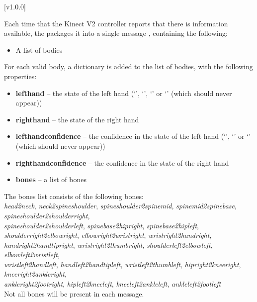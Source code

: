 [v1.0.0]

Each time that the Kinect V2 controller reports that there is information available,
the  packages it into a single message
\openSq{}\closeSq, containing the following:
\begin{itemize}
\item A list of bodies
\end{itemize}

For each valid body, a dictionary \openSq{}\closeSq{} is added to the list
of bodies, with the following properties:
\begin{itemize}
\item \textbf{lefthand} -- the state of the left hand (`', `',
`' or `' (which should never appear))
\item \textbf{righthand} -- the state of the right hand
\item \textbf{lefthandconfidence} -- the confidence in the state of the left hand
(`', `' or `' (which should never appear))
\item \textbf{righthandconfidence} -- the confidence in the state of the right hand
\item \textbf{bones} -- a list of bones
\end{itemize}

The bones list consists of the following bones:\\
\textbraceleft{} \emph{head2neck}, \emph{neck2spineshoulder},
\emph{spineshoulder2spinemid}, \emph{spinemid2spinebase},
\emph{spineshoulder2shoulderright},\\
\emph{spineshoulder2shoulderleft}, \emph{spinebase2hipright}, \emph{spinebase2hipleft},
\emph{shoulderright2elbowright}, \emph{elbowright2wristright},
\emph{wristright2handright}, \emph{handright2handtipright}, \emph{wristright2thumbright},
\emph{shoulderleft2elbowleft}, \emph{elbowleft2wristleft},\\
\emph{wristleft2handleft}, \emph{handleft2handtipleft}, \emph{wristleft2thumbleft},
\emph{hipright2kneeright}, \emph{kneeright2ankleright},\\
\emph{ankleright2footright}, \emph{hipleft2kneeleft}, \emph{kneeleft2ankleleft},
\emph{ankleleft2footleft} \textbraceright\\

Not all bones will be present in each message.\\

